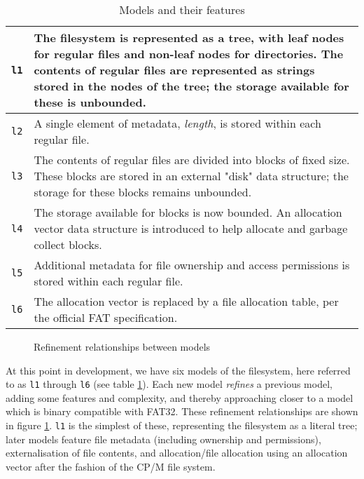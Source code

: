 \documentclass[runningheads,a4paper]{llncs}
\begin{document}
\begin{table}[]
  \centering
  \caption{Models and their features}
  \label{model-description-table}
  \begin{tabular}{|l|p{120mm}|}
    \hline
    \texttt{l1} & The filesystem is represented as a tree, with leaf
    nodes for regular files and non-leaf nodes for
    directories. The contents of regular files are represented as
    strings stored in the nodes of the tree; the storage available for
    these is unbounded. \\ \hline
    \texttt{l2} & A single element of metadata, \textit{length}, is
    stored within each regular file.  \\ \hline
    \texttt{l3} & The contents of regular files are divided into
    blocks of fixed size. These blocks are stored in an external
    "disk" data structure; the storage for these blocks remains
    unbounded. \\ \hline
    \texttt{l4} & The storage available for blocks is now bounded. An
    allocation vector data structure is introduced to help allocate
    and garbage collect blocks. \\ \hline
    \texttt{l5} & Additional metadata for file ownership and access
    permissions is stored within each regular file. \\ \hline
    \texttt{l6} & The allocation vector is replaced by a file
    allocation table, per the official FAT specification. \\ \hline
  \end{tabular}
\end{table}

\begin{figure}
  \centering
  \caption{Refinement relationships between models}
  \label{refinement-figure}
\end{figure}

At this point in development, we have six models of the filesystem,
here referred to as \texttt{l1} through \texttt{l6} (see
table \ref{model-description-table}). Each new model
\textit{refines} a previous model, adding some features and
complexity, and thereby approaching closer to a model which is binary
compatible with FAT32. These refinement relationships are shown in
figure \ref{refinement-figure}. \texttt{l1} is the simplest of these,
representing the filesystem as a literal tree; later models feature
file metadata (including ownership and permissions), externalisation
of file contents, and allocation/file allocation using an allocation
vector after the fashion of the CP/M file system.
\end{document}
